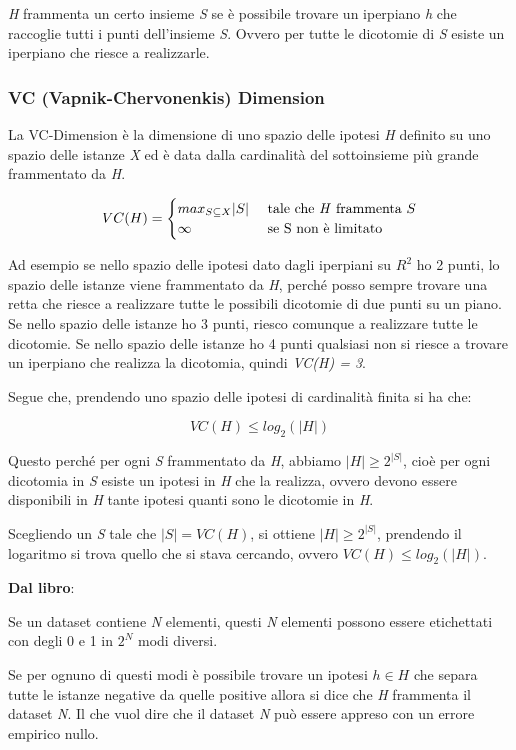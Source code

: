 \emph{H} frammenta un certo insieme \emph{S} se è possibile trovare un
iperpiano \emph{h} che raccoglie tutti i punti dell'insieme \emph{S}. Ovvero per
tutte le dicotomie di \emph{S} esiste un iperpiano che riesce a
realizzarle.

\subsubsection{VC (Vapnik-Chervonenkis) Dimension}\label{vc-vapnik-chervonenkis-dimension}

La VC-Dimension è la dimensione di uno spazio delle ipotesi \emph{H}
definito su uno spazio delle istanze \emph{X} ed è data dalla
cardinalità del sottoinsieme più grande frammentato da \emph{H}.

$$
VC(H) =
\begin{cases}
max_{S \subseteq X} |S|&\text{ tale che \emph{H} frammenta } S  \\
 \infty& \text{ se S non è limitato}
\end{cases}
$$


Ad esempio se nello spazio delle ipotesi dato dagli iperpiani su $R^2$ ho 2 punti, lo spazio delle istanze viene frammentato da
\emph{H}, perché posso sempre trovare una retta che riesce a realizzare
tutte le possibili dicotomie di due punti su un piano.
Se nello spazio delle istanze ho 3 punti, riesco comunque a realizzare
tutte le dicotomie.
Se nello spazio delle istanze ho 4 punti qualsiasi non si riesce a
trovare un iperpiano che realizza la dicotomia, quindi \emph{VC(H) =
3}.

Segue che, prendendo uno spazio delle ipotesi di cardinalità finita si
ha che:

$$
VC(H) \leq log_2(|H|)
$$

Questo perché per ogni \emph{S} frammentato da \emph{H}, abbiamo
$|H| \geq 2^{|S|}$,
cioè per ogni dicotomia in \emph{S} esiste un ipotesi in \emph{H} che la
realizza, ovvero devono essere disponibili in \emph{H} tante ipotesi
quanti sono le dicotomie in \emph{H}.

Scegliendo un \emph{S} tale che $|S| = VC(H)$, si
ottiene $|H| \geq 2^{|S|}$, prendendo
il logaritmo si trova quello che si stava cercando, ovvero $VC(H) \leq log_2(|H|)$.

\textbf{Dal libro}:

Se un dataset contiene \emph{N} elementi, questi \emph{N} elementi
possono essere etichettati con degli 0 e 1 in $2^N$ modi diversi.

Se per ognuno di questi modi è possibile trovare un ipotesi $h \in H$
che separa tutte le istanze negative da quelle positive allora si dice
che \emph{H} frammenta il dataset \emph{N}. 
Il che vuol dire che il dataset \emph{N} può essere appreso con un errore empirico nullo.

